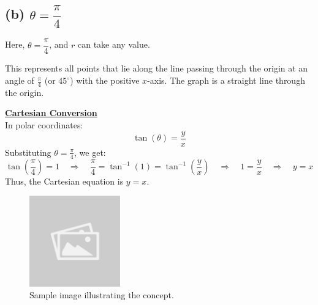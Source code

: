 \documentclass{article}
\begin{document}
\subsection*{(b) \( \theta = \dfrac{\pi}{4} \)}
\begin{solutionbox}
Here, \( \theta = \dfrac{\pi}{4} \), and \( r \) can take any value. 

This represents all points that lie along the line passing through the origin at an angle of \( \frac{\pi}{4} \) (or \( 45^\circ \)) with the positive \( x \)-axis. The graph is a straight line through the origin.

\begin{remarkbox}
    \textbf{\underline{Cartesian Conversion}} \\
    In polar coordinates:
    \[
    \tan(\theta) = \frac{y}{x}
    \]
    Substituting \( \theta = \frac{\pi}{4} \), we get:
    \[
    \tan\left(\frac{\pi}{4}\right) = 1 \quad \Rightarrow \quad \frac{\pi}{4} = \tan^{-1}\left(1\right) = \tan^{-1}\left(\frac{y}{x}\right) \quad \Rightarrow \quad 1 = \frac{y}{x} \quad \Rightarrow \quad y = x
    \]
    Thus, the Cartesian equation is \( y = x \).
\end{remarkbox}
\begin{figure}[H]
    \centering
    \includegraphics[width=0.35\textwidth]{sample_image.jpg}
    \caption{Sample image illustrating the concept.}
    \label{fig:sample_image}
\end{figure}
\end{solutionbox}
\end{document}
